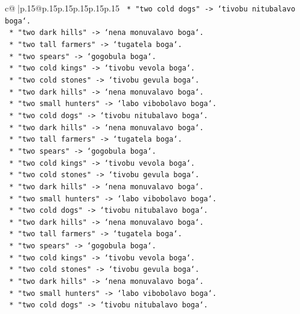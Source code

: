 \documentclass{article}
\begin{document}
{\begin{supertabular}{c@{$\;$}|p{.15\linewidth}@{}p{.15\linewidth}p{.15\linewidth}p{.15\linewidth}p{.15\linewidth}p{.15\linewidth}}
{{{\texttt{        *   "two cold dogs" {-}> `tivobu nitubalavo boga`.} \\
\texttt{        *   "two dark hills" {-}> `nena monuvalavo boga`.} \\
\texttt{        *   "two tall farmers" {-}> `tugatela boga`.} \\
\texttt{        *   "two spears" {-}> `gogobula boga`.} \\
\texttt{        *   "two cold kings" {-}> `tivobu vevola boga`.} \\
\texttt{        *   "two cold stones" {-}> `tivobu gevula boga`.} \\
\texttt{        *   "two dark hills" {-}> `nena monuvalavo boga`.} \\
\texttt{        *   "two small hunters" {-}> `labo vibobolavo boga`.} \\
\texttt{        *   "two cold dogs" {-}> `tivobu nitubalavo boga`.} \\
\texttt{        *   "two dark hills" {-}> `nena monuvalavo boga`.} \\
\texttt{        *   "two tall farmers" {-}> `tugatela boga`.} \\
\texttt{        *   "two spears" {-}> `gogobula boga`.} \\
\texttt{        *   "two cold kings" {-}> `tivobu vevola boga`.} \\
\texttt{        *   "two cold stones" {-}> `tivobu gevula boga`.} \\
\texttt{        *   "two dark hills" {-}> `nena monuvalavo boga`.} \\
\texttt{        *   "two small hunters" {-}> `labo vibobolavo boga`.} \\
\texttt{        *   "two cold dogs" {-}> `tivobu nitubalavo boga`.} \\
\texttt{        *   "two dark hills" {-}> `nena monuvalavo boga`.} \\
\texttt{        *   "two tall farmers" {-}> `tugatela boga`.} \\
\texttt{        *   "two spears" {-}> `gogobula boga`.} \\
\texttt{        *   "two cold kings" {-}> `tivobu vevola boga`.} \\
\texttt{        *   "two cold stones" {-}> `tivobu gevula boga`.} \\
\texttt{        *   "two dark hills" {-}> `nena monuvalavo boga`.} \\
\texttt{        *   "two small hunters" {-}> `labo vibobolavo boga`.} \\
\texttt{        *   "two cold dogs" {-}> `tivobu nitubalavo boga`.} \\
}}}
\end{supertabular}}
\end{document}
